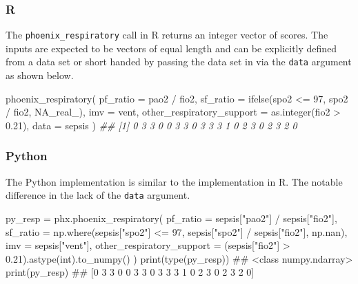 \documentclass[
  letterpaper,
  DIV=11,
  numbers=noendperiod]{scrartcl}
\newenvironment{Shaded}{\begin{snugshade}}{\end{snugshade}}
\newcommand{\AttributeTok}[1]{\textcolor[rgb]{0.40,0.45,0.13}{#1}}
\newcommand{\BuiltInTok}[1]{\textcolor[rgb]{0.00,0.23,0.31}{#1}}
\newcommand{\CommentTok}[1]{\textcolor[rgb]{0.37,0.37,0.37}{#1}}
\newcommand{\ConstantTok}[1]{\textcolor[rgb]{0.56,0.35,0.01}{#1}}
\newcommand{\DecValTok}[1]{\textcolor[rgb]{0.68,0.00,0.00}{#1}}
\newcommand{\DocumentationTok}[1]{\textcolor[rgb]{0.37,0.37,0.37}{\textit{#1}}}
\newcommand{\FloatTok}[1]{\textcolor[rgb]{0.68,0.00,0.00}{#1}}
\newcommand{\FunctionTok}[1]{\textcolor[rgb]{0.28,0.35,0.67}{#1}}
\newcommand{\NormalTok}[1]{\textcolor[rgb]{0.00,0.23,0.31}{#1}}
\newcommand{\OperatorTok}[1]{\textcolor[rgb]{0.37,0.37,0.37}{#1}}
\newcommand{\SpecialCharTok}[1]{\textcolor[rgb]{0.37,0.37,0.37}{#1}}
\newcommand{\StringTok}[1]{\textcolor[rgb]{0.13,0.47,0.30}{#1}}
\begin{document}
\subsubsection{R}\label{r-2}

The \texttt{phoenix\_respiratory} call in R returns an integer vector of
scores. The inputs are expected to be vectors of equal length and can be
explicitly defined from a data set or short handed by passing the data
set in via the \texttt{data} argument as shown below.

\begin{Shaded}
\begin{Highlighting}[]
\FunctionTok{phoenix\_respiratory}\NormalTok{(}
  \AttributeTok{pf\_ratio =}\NormalTok{ pao2 }\SpecialCharTok{/}\NormalTok{ fio2,}
  \AttributeTok{sf\_ratio =} \FunctionTok{ifelse}\NormalTok{(spo2 }\SpecialCharTok{\textless{}=} \DecValTok{97}\NormalTok{, spo2 }\SpecialCharTok{/}\NormalTok{ fio2, }\ConstantTok{NA\_real\_}\NormalTok{),}
  \AttributeTok{imv =}\NormalTok{ vent,}
  \AttributeTok{other\_respiratory\_support =} \FunctionTok{as.integer}\NormalTok{(fio2 }\SpecialCharTok{\textgreater{}} \FloatTok{0.21}\NormalTok{),}
  \AttributeTok{data =}\NormalTok{ sepsis}
\NormalTok{)}
\DocumentationTok{\#\#  [1] 0 3 3 0 0 3 3 0 3 3 3 1 0 2 3 0 2 3 2 0}
\end{Highlighting}
\end{Shaded}

\subsubsection{Python}\label{python-2}

The Python implementation is similar to the implementation in R. The
notable difference in the lack of the \texttt{data} argument.

\begin{Shaded}
\begin{Highlighting}[]
\NormalTok{py\_resp }\OperatorTok{=}\NormalTok{ phx.phoenix\_respiratory(}
\NormalTok{    pf\_ratio }\OperatorTok{=}\NormalTok{ sepsis[}\StringTok{"pao2"}\NormalTok{] }\OperatorTok{/}\NormalTok{ sepsis[}\StringTok{"fio2"}\NormalTok{],}
\NormalTok{    sf\_ratio }\OperatorTok{=}\NormalTok{ np.where(sepsis[}\StringTok{"spo2"}\NormalTok{] }\OperatorTok{\textless{}=} \DecValTok{97}\NormalTok{, sepsis[}\StringTok{"spo2"}\NormalTok{] }\OperatorTok{/}\NormalTok{ sepsis[}\StringTok{"fio2"}\NormalTok{], np.nan),}
\NormalTok{    imv      }\OperatorTok{=}\NormalTok{ sepsis[}\StringTok{"vent"}\NormalTok{],}
\NormalTok{    other\_respiratory\_support }\OperatorTok{=}\NormalTok{ (sepsis[}\StringTok{"fio2"}\NormalTok{] }\OperatorTok{\textgreater{}} \FloatTok{0.21}\NormalTok{).astype(}\BuiltInTok{int}\NormalTok{).to\_numpy()}
\NormalTok{)}
\BuiltInTok{print}\NormalTok{(}\BuiltInTok{type}\NormalTok{(py\_resp))}
\CommentTok{\#\# \textless{}class \textquotesingle{}numpy.ndarray\textquotesingle{}\textgreater{}}
\BuiltInTok{print}\NormalTok{(py\_resp)}
\CommentTok{\#\# [0 3 3 0 0 3 3 0 3 3 3 1 0 2 3 0 2 3 2 0]}
\end{Highlighting}
\end{Shaded}
\end{document}
